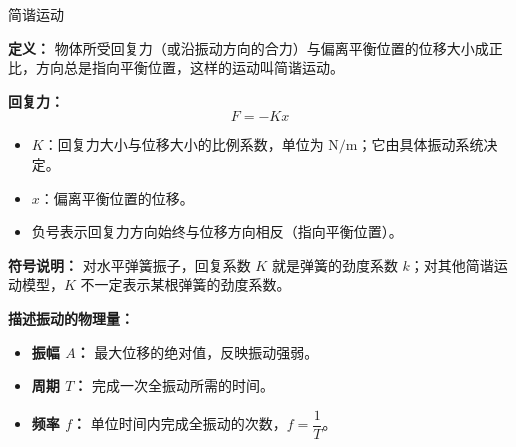 \begin{conceptbox}{简谐运动}

\textbf{定义：} 物体所受回复力（或沿振动方向的合力）与偏离平衡位置的位移大小成正比，方向总是指向平衡位置，这样的运动叫简谐运动。

\textbf{回复力：}
\[
\boxed{F = -Kx}
\]

\begin{itemize}
  \item $K$：回复力大小与位移大小的比例系数，单位为 $\mathrm{N/m}$；它由具体振动系统决定。
  \item $x$：偏离平衡位置的位移。
  \item 负号表示回复力方向始终与位移方向相反（指向平衡位置）。
\end{itemize}

\textbf{符号说明：} 对水平弹簧振子，回复系数 $K$ 就是弹簧的劲度系数 $k$；对其他简谐运动模型，$K$ 不一定表示某根弹簧的劲度系数。

\textbf{描述振动的物理量：}
\begin{itemize}
  \item \textbf{振幅 $A$：} 最大位移的绝对值，反映振动强弱。
  \item \textbf{周期 $T$：} 完成一次全振动所需的时间。
  \item \textbf{频率 $f$：} 单位时间内完成全振动的次数，$f = \dfrac{1}{T}$。
\end{itemize}

\end{conceptbox}

